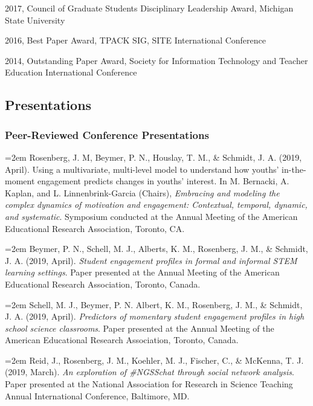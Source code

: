 \documentclass[14,]{article}
\begin{document}
2017, Council of Graduate Students Disciplinary Leadership Award,
Michigan State University

2016, Best Paper Award, TPACK SIG, SITE International Conference

2014, Outstanding Paper Award, Society for Information Technology and
Teacher Education International Conference

\hypertarget{presentations}{%
\subsection{Presentations}\label{presentations}}

\hypertarget{peer-reviewed-conference-presentations}{%
\subsubsection{Peer-Reviewed Conference
Presentations}\label{peer-reviewed-conference-presentations}}

\hangindent=2em Rosenberg, J. M, Beymer, P. N., Houslay, T. M., \&
Schmidt, J. A. (2019, April). Using a multivariate, multi-level model to
understand how youths' in-the-moment engagement predicts changes in
youths' interest. In M. Bernacki, A. Kaplan, and L. Linnenbrink-Garcia
(Chairs), \emph{Embracing and modeling the complex dynamics of
motivation and engagement: Contextual, temporal, dynamic, and
systematic}. Symposium conducted at the Annual Meeting of the American
Educational Research Association, Toronto, CA.

\hangindent=2em Beymer, P. N., Schell, M. J., Alberts, K. M., Rosenberg,
J. M., \& Schmidt, J. A. (2019, April). \emph{Student engagement
profiles in formal and informal STEM learning settings}. Paper presented
at the Annual Meeting of the American Educational Research Association,
Toronto, Canada.

\hangindent=2em Schell, M. J., Beymer, P. N. Albert, K. M., Rosenberg,
J. M., \& Schmidt, J. A. (2019, April). \emph{Predictors of momentary
student engagement profiles in high school science classrooms}. Paper
presented at the Annual Meeting of the American Educational Research
Association, Toronto, Canada.

\hangindent=2em Reid, J., Rosenberg, J. M., Koehler, M. J., Fischer, C.,
\& McKenna, T. J. (2019, March). \emph{An exploration of \#NGSSchat
through social network analysis}. Paper presented at the National
Association for Research in Science Teaching Annual International
Conference, Baltimore, MD.
\end{document}
